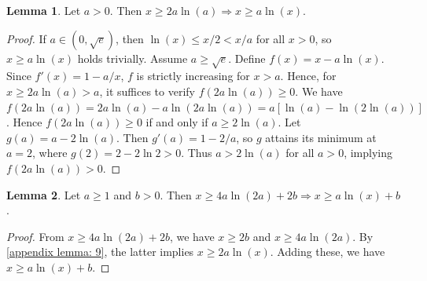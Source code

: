 \documentclass[openany, amssymb, psamsfonts]{amsart}
\theoremstyle{definition}
\numberwithin{equation}{section}
\newtheorem{appendixlemma}{Lemma}
\begin{document}
\begin{appendixlemma}\label{appendix lemma: 9}
Let $a > 0$. Then $x \ge 2a\ln(a) \Rightarrow x \ge a\ln(x)$.
\end{appendixlemma}

\begin{proof}
If $a \in (0,\sqrt{e})$, then $\ln(x) \le x/2 < x/a$ for all $x>0$, so $x \ge a\ln(x)$ holds trivially.  
Assume $a \ge \sqrt{e}$. Define $f(x)=x-a\ln(x)$. Since $f'(x)=1-a/x$, $f$ is strictly increasing for $x>a$. Hence, for $x \ge 2a\ln(a)>a$, it suffices to verify $f(2a\ln(a))\ge0$. We have $f(2a\ln(a)) = 2a\ln(a) - a\ln(2a\ln(a)) = a[\ln(a) - \ln(2\ln(a))]$. Hence $f(2a\ln(a))\ge0$ if and only if $a \ge 2\ln(a)$.  
Let $g(a)=a-2\ln(a)$. Then $g'(a)=1-2/a$, so $g$ attains its minimum at $a=2$, where $g(2)=2-2\ln2>0$. Thus $a>2\ln(a)$ for all $a>0$, implying $f(2a\ln(a))>0$.
\end{proof}


\begin{appendixlemma}\label{appendix lemma: 10}
Let \( a \geq 1 \) and \( b > 0 \). Then \( x \geq 4a \ln(2a) + 2b \Rightarrow x \geq a \ln(x) + b \).
\end{appendixlemma}
\begin{proof}
From $x \ge 4a\ln(2a) + 2b$, we have $x \ge 2b$ and $x \ge 4a\ln(2a)$.  
By \autoref{appendix lemma: 9}, the latter implies $x \ge 2a\ln(x)$. Adding these, we have $x \ge a\ln(x) + b$.
\end{proof}
\end{document}
